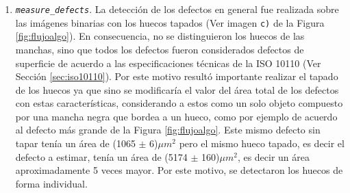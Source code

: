 \begin{enumerate}
\item \texttt{\textit{measure\_defects}}. La detección de los defectos en general fue realizada sobre las imágenes binarias con los huecos tapados (Ver imagen \texttt{c)} de la Figura \ref{fig:flujoalgo}). En consecuencia, no se distinguieron los huecos de las manchas, sino que todos los defectos fueron considerados defectos de superficie de acuerdo a las especificaciones técnicas de la ISO 10110 (Ver Sección \ref{sec:iso10110}). Por este motivo resultó importante realizar el tapado de los huecos ya que sino se modificaría el valor del área total de los defectos con estas características, considerando a estos como un solo objeto compuesto por una mancha negra que bordea a un hueco, como por ejemplo de acuerdo al defecto más grande de la Figura \ref{fig:flujoalgo}. Este mismo defecto sin tapar tenía un área de (1065 $\pm$ 6)$\mu m^{2}$ pero el mismo hueco tapado, es decir el defecto a estimar, tenía un área de (5174 $\pm$ 160)$\mu m^{2}$, es decir un área aproximadamente 5 veces mayor. Por este motivo, se detectaron los huecos de forma individual.


\end{enumerate}
